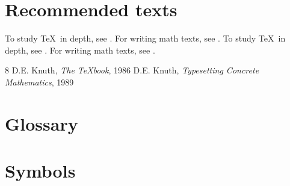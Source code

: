 \documentclass{book}
\begin{document}
\chapter*{Recommended texts}
To study \TeX\ in depth, see \cite{DK86}.
For writing math texts, see \cite{DK89}.
To study \TeX\ in depth, see \cite{DK862}.
For writing math texts, see \cite{DK892}.
\nocite{*}

\begin{thebibliography}{8}
     D.E. Knuth, \emph{The {\TeX}book}, 1986
     D.E. Knuth, \emph{Typesetting Concrete
    Mathematics}, 1989
\end{thebibliography}




\appendix
\cleardoublepage
{}
\chapter{Glossary}
\chapter{Symbols}

\clearpage
{}
\printindex
\end{document}
